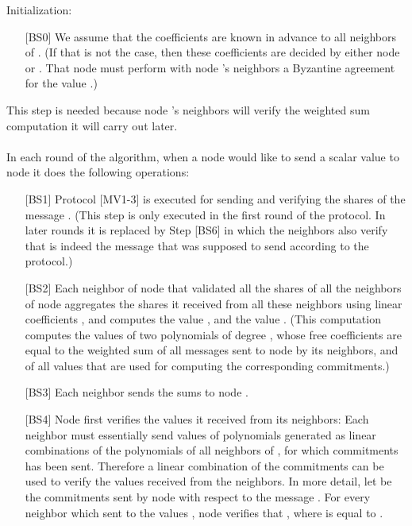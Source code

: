 \documentclass[10pt]{svjour3}
\begin{document}
Initialization:
\begin{itemize}
\item [{[BS0]}] We assume that the coefficients  are known in
  advance to all neighbors of . (If that is not the case, then
  these coefficients are decided by either node  or . That node
  must perform with node 's neighbors a Byzantine agreement for the
  value .)
\end{itemize}
This step is needed because node 's neighbors will verify the weighted
sum computation it will carry out later.\\
\\
In each round of the algorithm, when a node  would like to send
a scalar value  to node  it does the following operations:
\begin{itemize}
\item [{[BS1]}] Protocol [MV1-3] is executed for sending and verifying
  the shares of the message . (This step is only executed in
  the first round of the protocol. In later rounds it is replaced by
  Step [BS6] in which the neighbors also verify that   is
  indeed the message that  was supposed to send according to the
  protocol.)

\item [{[BS2]}] Each neighbor  of node  that validated all the
  shares of all the neighbors of node  aggregates the shares it
  received from all these neighbors using linear coefficients , and computes the value , and the value .  (This computation computes the values of
  two polynomials of degree , whose free coefficients are equal
  to the weighted sum of all messages  sent to node 
  by its neighbors, and of all values  that are used for
  computing the corresponding commitments.)

\item [{[BS3]}] Each neighbor  sends the sums 
      to node .

\item [{[BS4]}] Node  first verifies the values it received
      from its neighbors: Each neighbor must
      essentially send values of polynomials generated as linear
      combinations of the polynomials  of all neighbors
       of , for which
      commitments has been sent. Therefore a linear combination of the
      commitments can be used to verify the values received from the
      neighbors.  In more detail, let  be the commitments
      sent by node  with respect to the message
      . For every neighbor  which sent to  the values , node  verifies that , where  is equal
      to .


\end{itemize}
\end{document}
